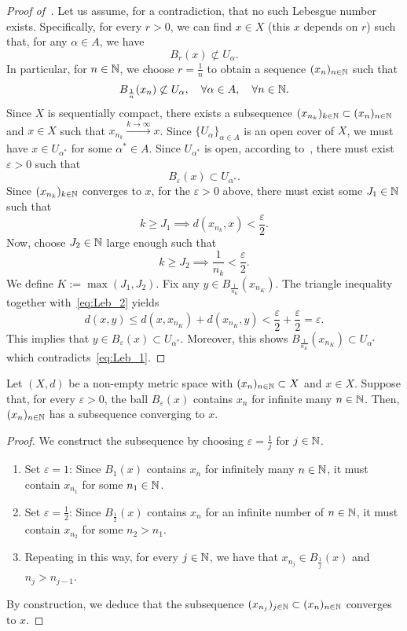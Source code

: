 \begin{proof}[Proof of~]
	Let us assume, for a contradiction, that no such Lebesgue number exists. Specifically, for every $r>0$, we can find $x\in X$ (this $x$ depends on $r$) such that, for any $\alpha \in A$, we have
	\[
	B_r(x)\not\subset U_\alpha.
	\]
	In particular, for $n\in\mathbb{N}$, we choose $r = \frac{1}{n}$ to obtain a sequence $(x_n)_{n\in\mathbb{N}}$ such that
	\begin{equation}
		\label{eq:Leb_1}
	B_\frac{1}{n}(x_n)\not\subset U_\alpha,\quad \forall \alpha \in A,\quad \forall n\in\mathbb{N}.
	\end{equation}
	Since $X$ is sequentially compact, there exists a subsequence $(x_{n_k})_{k\in\mathbb{N}}\subset (x_n)_{n\in\mathbb{N}}$ and $x\in X$ such that $x_{n_k}\overset{k\to \infty}{\to}x$. Since $\{U_\alpha\}_{\alpha \in A}$ is an open cover of $X$, we must have $x\in U_{\alpha^*}$ for some $\alpha^*\in A$. Since $U_{\alpha^*}$ is open, according to~, there must exist $\varepsilon>0$ such that
	\[
	B_\varepsilon(x)\subset U_{\alpha^*}.
	\]
	Since $(x_{n_k})_{k\in\mathbb{N}}$ converges to $x$, for the $\varepsilon>0$ above, there must exist some $J_1\in\mathbb{N}$ such that
	\begin{equation}
		\label{eq:Leb_2}
	k\ge J_1 \implies d(x_{n_k},x)< \frac{\varepsilon}{2}.
	\end{equation}
	Now, choose $J_2\in\mathbb{N}$ large enough such that
	\[
	k \ge J_2 \implies \frac{1}{n_k}< \frac{\varepsilon}{2}.
	\]
	We define $K:= \max(J_1,J_2)$. Fix any $y \in B_\frac{1}{n_K}(x_{n_K})$. The triangle inequality together with~\eqref{eq:Leb_2} yields
	\[
	d(x,y) \le d(x,x_{n_K}) + d(x_{n_K},y) < \frac{\varepsilon}{2} +\frac{\varepsilon}{2} = \varepsilon.
	\]
	This implies that $y \in B_\varepsilon(x)\subset U_{\alpha^*}$. Moreover, this shows $B_\frac{1}{n_K}(x_{n_K})\subset U_{\alpha^*}$ which contradicts~\eqref{eq:Leb_1}.
\end{proof}
\begin{prop}
\label{prop:seq_ball_inf}
Let $(X,d)$ be a non-empty metric space with $(x_n)_{n\in\mathbb{N}}\subset X$ and $x\in X$. Suppose that, for every $\varepsilon>0$, the ball $B_\varepsilon(x)$ contains $x_n$ for infinite many $n\in\mathbb{N}$. Then, $(x_n)_{n\in\mathbb{N}}$ has a subsequence converging to $x$.
\end{prop}
\begin{proof}
We construct the subsequence by choosing $\varepsilon = \frac{1}{j}$ for $j\in\mathbb{N}$.
\begin{enumerate}
\item Set $\varepsilon=1$: Since $B_1(x)$ contains $x_n$ for infinitely many $n\in\mathbb{N}$, it must contain $x_{n_1}$ for some $n_1\in\mathbb{N}$.
\item Set $\varepsilon = \frac{1}{2}$: Since $B_\frac{1}{2}(x)$ contains $x_n$ for an infinite number of $n\in\mathbb{N}$, it must contain $x_{n_2}$ for some $n_2 > n_1$.
\item Repeating in this way, for every $j\in\mathbb{N}$, we have that $x_{n_j}\in B_\frac{1}{j}(x)$ and $n_j>n_{j-1}$. 
\end{enumerate}
By construction, we deduce that the subsequence $(x_{n_j})_{j\in\mathbb{N}}\subset (x_n)_{n\in\mathbb{N}}$ converges to $x$.
\end{proof}
